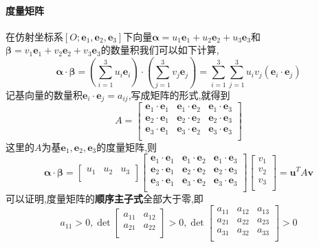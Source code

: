 \documentclass{article}
\newcommand{\ve}{\boldsymbol}
\begin{document}
\begin{CJK}{UTF8}{gkai}
\paragraph{度量矩阵\\}
在仿射坐标系$[O;\ve{e}_1,\ve{e}_2,\ve{e}_3]$下向量$\ve{\alpha}=u_1\ve{e}_1+u_2\ve{e}_2+u_3\ve{e}_3$和$\ve{\beta}=v_1\ve{e}_1+v_2\ve{e}_2+v_3\ve{e}_3$的数量积我们可以如下计算,\\
\[\ve{\alpha}\cdot\ve{\beta}=(\sum_{i=1}^3 u_i\ve{e}_i)\cdot(\sum_{j=1}^3 v_j\ve{e}_j)=\sum_{i=1}^3\sum_{j=1}^3 u_i v_j(\ve{e}_i\cdot\ve{e}_j)
\]
记基向量的数量积$\ve{e}_i\cdot\ve{e}_j=a_{ij}$,写成矩阵的形式,就得到\\
\[A=
\begin{bmatrix}
\ve{e}_1\cdot\ve{e}_1&\ve{e}_1\cdot\ve{e}_2&\ve{e}_1\cdot\ve{e}_3\\
\ve{e}_2\cdot\ve{e}_1&\ve{e}_2\cdot\ve{e}_2&\ve{e}_2\cdot\ve{e}_3\\
\ve{e}_3\cdot\ve{e}_1&\ve{e}_3\cdot\ve{e}_2&\ve{e}_3\cdot\ve{e}_3\\    
\end{bmatrix}\]
这里的$A$为基$\ve{e}_1,\ve{e}_2,\ve{e}_3$的度量矩阵,则\\
\[\ve{\alpha}\cdot\ve{\beta}=
\begin{bmatrix}
    u_1&u_2&u_3\\
\end{bmatrix}
\begin{bmatrix}
    \ve{e}_1\cdot\ve{e}_1&\ve{e}_1\cdot\ve{e}_2&\ve{e}_1\cdot\ve{e}_3\\
    \ve{e}_2\cdot\ve{e}_1&\ve{e}_2\cdot\ve{e}_2&\ve{e}_2\cdot\ve{e}_3\\
    \ve{e}_3\cdot\ve{e}_1&\ve{e}_3\cdot\ve{e}_2&\ve{e}_3\cdot\ve{e}_3\\    
\end{bmatrix}
\begin{bmatrix}
    v_1\\
    v_2\\
    v_3\\
\end{bmatrix}
=\ve{u}^T A \ve{v}
\]
可以证明,度量矩阵的\textbf{顺序主子式}全部大于零,即\\
\[a_{11}>0 ,\det\begin{bmatrix}a_{11}&a_{12}\\a_{21}&a_{22}\\\end{bmatrix}>0,\det\begin{bmatrix}a_{11}&a_{12}&a_{13}\\a_{21}&a_{22}&a_{23}\\a_{31}&a_{32}&a_{33}\\\end{bmatrix}>0\]






\end{CJK}
\end{document}
